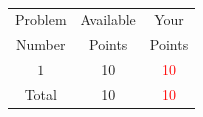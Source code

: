 \documentclass[]{exam}
\numberwithin{equation}{section}
\begin{document}


\clearpage
\normalsize
\
\vspace{.5cm}

\huge
\begin{center}
\begin{tabular}{|c|c|c|}
\hline
Problem  & Available  &   Your  \\
Number & Points &    Points  \\	\hline\hline

 $1$  & 10  &  \textcolor{red}{10}  \\	\hline

Total & 10  & \textcolor{red}{10} \\ \hline
\end{tabular}
\end{center}

\pagebreak
\end{document}
